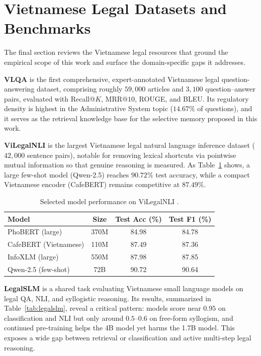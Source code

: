 \section{Vietnamese Legal Datasets and Benchmarks}
\label{sec:vndata}

The final section reviews the Vietnamese legal resources that ground the empirical scope of this work and surface the domain-specific gaps it addresses.

\textbf{VLQA} \parencite{nguyen2025vlqacomprehensivelargehighquality} is the first comprehensive, expert-annotated Vietnamese legal question-answering dataset, comprising roughly $59{,}000$ articles and $3{,}100$ question--answer pairs, evaluated with Recall@$K$, MRR@$10$, ROUGE, and BLEU. Its regulatory density is highest in the Administrative System topic ($14.67\%$ of questions), and it serves as the retrieval knowledge base for the selective memory proposed in this work.

\textbf{ViLegalNLI} \parencite{duong2026vilegalnlinaturallanguageinference} is the largest Vietnamese legal natural language inference dataset ($42{,}000$ sentence pairs), notable for removing lexical shortcuts via pointwise mutual information so that genuine reasoning is measured. As Table~\ref{tab:vilegalnli} shows, a large few-shot model (Qwen-2.5) reaches $90.72\%$ test accuracy, while a compact Vietnamese encoder (CafeBERT) remains competitive at $87.49\%$.

\begin{table}[H]
\centering
\small
\caption{Selected model performance on ViLegalNLI \parencite{duong2026vilegalnlinaturallanguageinference}.}
\label{tab:vilegalnli}
\begin{tabularx}{\textwidth}{X c c c}
\hline
\textbf{Model} & \textbf{Size} & \textbf{Test Acc (\%)} & \textbf{Test F1 (\%)} \\
\hline
PhoBERT (large) & 370M & 84.98 & 84.78 \\
CafeBERT (Vietnamese) & 110M & 87.49 & 87.36 \\
InfoXLM (large) & 550M & 87.98 & 87.85 \\
Qwen-2.5 (few-shot) & 72B & 90.72 & 90.64 \\
\hline
\end{tabularx}
\end{table}

\textbf{LegalSLM} \parencite{le-etal-2025-overview} is a shared task evaluating Vietnamese small language models on legal QA, NLI, and syllogistic reasoning. Its results, summarized in Table~\ref{tab:legalslm}, reveal a critical pattern: models score near $0.95$ on classification and NLI but only around $0.5$--$0.6$ on free-form syllogism, and continued pre-training helps the 4B model yet harms the 1.7B model. This exposes a wide gap between retrieval or classification and active multi-step legal reasoning.

